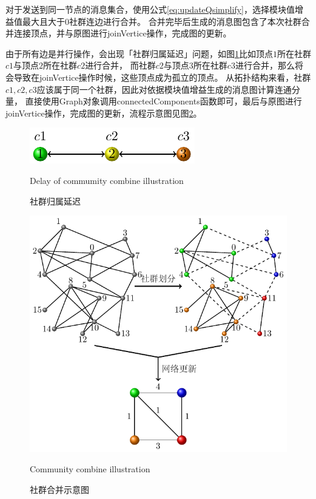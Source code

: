 对于发送到同一节点的消息集合，使用公式\eqref{eq:updateQsimplify}，选择模块值增益值最大且大于$0$社群连边进行合并。
合并完毕后生成的消息图包含了本次社群合并连接顶点，并与原图进行joinVertice操作，完成图的更新。

由于所有边是并行操作，会出现「社群归属延迟」问题，如图\ref{fig:communityDelay}比如顶点$1$所在社群$c1$与顶点$2$所在社群$c2$进行合并，
而社群$c2$与顶点$3$所在社群$c3$进行合并，那么将会导致在joinVertice操作时候，这些顶点成为孤立的顶点。
从拓扑结构来看，社群$c1,c2,c3$应该属于同一个社群，因此对依据模块值增益生成的消息图计算连通分量，
直接使用Graph对象调用connectedComponents函数即可，最后与原图进行joinVertice操作，完成图的更新，流程示意图见图\ref{fig:Communitycombine}。
\begin{figure}
\centering
\includegraphics{figures/communitycombine.pdf}\\
  \caption{社群归属延迟}{Delay of commumity combine illustration}
  \label{fig:communityDelay}
\end{figure}

\begin{figure}
  \centering
  \includegraphics[scale=0.8]{figures/community.pdf}\\
  \caption{社群合并示意图}{Community combine illustration}
  \label{fig:Communitycombine}
\end{figure}

